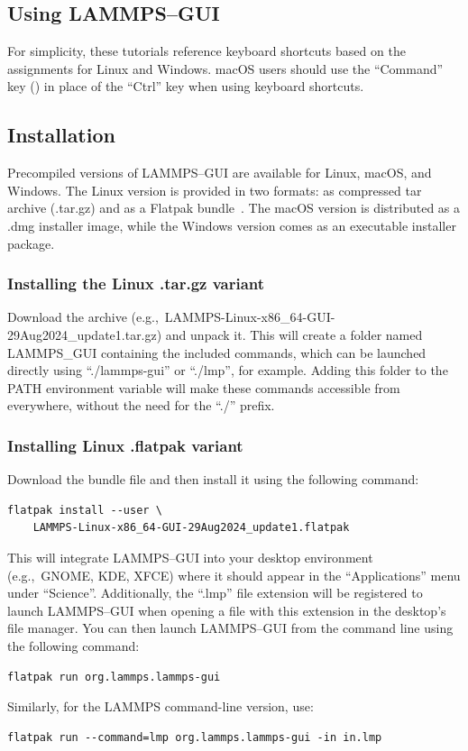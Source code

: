 \documentclass[9pt,tutorial]{livecoms}
\begin{document}
\begin{appendices}
\section{Using LAMMPS--GUI}
\label{using-lammps-gui-label}

\begin{note}
For simplicity, these tutorials reference keyboard shortcuts
based on the assignments for Linux and Windows.  {macOS} users should
use the ``Command'' key (\cmd) in place of the
``Ctrl'' key when using keyboard shortcuts.
\end{note}

\subsection{Installation}

Precompiled versions of LAMMPS--GUI are available for Linux, {macOS}, and
Windows.  The Linux version is provided in two formats: as compressed tar
archive (.tar.gz) and as a Flatpak bundle~\cite{flatpak_home}.  The {macOS}
version is distributed as a .dmg installer image, while the Windows version comes
as an executable installer package.

\subsubsection{Installing the Linux .tar.gz variant}

Download the archive (e.g.,~LAMMPS-Linux-x86\_64-GUI-29Aug2024\_update1.tar.gz)
and unpack it.  This will create a folder named LAMMPS\_GUI containing the
included commands, which can be launched directly using ``./lammps-gui'' or
``./lmp'', for example.  Adding this folder to the PATH environment
variable will make these commands accessible from everywhere, without the
need for the ``./'' prefix.

\subsubsection{Installing Linux .flatpak variant}

Download the bundle file and then install it using the following command:
\begin{lstlisting}
flatpak install --user \
    LAMMPS-Linux-x86_64-GUI-29Aug2024_update1.flatpak
\end{lstlisting}
This will integrate LAMMPS--GUI into your desktop environment
(e.g.,~GNOME, KDE, XFCE) where it should appear in the ``Applications''
menu under ``Science''.  Additionally, the ``.lmp'' file extension will be
registered to launch LAMMPS--GUI when opening a file with this
extension in the desktop's file manager.  You can then
launch LAMMPS--GUI from the command line using the following command:
\begin{lstlisting}
flatpak run org.lammps.lammps-gui
\end{lstlisting}
Similarly, for the LAMMPS command-line version, use:
\begin{lstlisting}
flatpak run --command=lmp org.lammps.lammps-gui -in in.lmp
\end{lstlisting}


\end{appendices}
\end{document}
